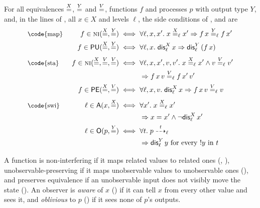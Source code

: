\begin{definition}\label{def:side}
For all equivalences $\overset{X}{=}$, $\overset{Y}{=}$ and $\overset{V}{=}$, functions $f$ and processes
$p$ with output type $Y$, and, in the lines of , all $x \in X$ and levels
$\ell$, the side conditions of ,  and  are
\begin{alignat*}{2}
&\text{\small\code{map}}\; & f \in \NI(\eqv{X},\eqv{Y}) &\iff \forall \ell, x, x'.\;
  x \eqv{X}_\ell x' \Rightarrow f\,x \eqv{Y}_\ell f\,x' \\
&& f \in \mathsf{PU}(\eqv{X},\eqv{Y}) &\iff \forall \ell, x.\;
  \dis^X_\ell\,x \Rightarrow \dis^Y_\ell\,(f\,x) \\[3pt]
&\text{\small\code{sta}} & f \in \NI(\eqv{X},\eqv{V},\eqv{V}) &\iff \forall \ell, x, x', v, v'.\;
  x \eqv{X}_\ell x' \wedge v \eqv{V}_\ell v' \\
&&  &\hphantom{{}\iff{}} \Rightarrow f\,x\,v \eqv{V}_\ell f\,x'\,v' \\
&& f \in \mathsf{PE}(\eqv{X},\eqv{V}) &\iff \forall \ell, x, v.\;
  \dis^X_\ell\,x \Rightarrow f\,x\,v \eqv{V}_\ell v \\[3pt]
&\text{\small\code{swi}} & \ell \in \Aw(x,\eqv{X}) &\iff \forall x'.\; x \eqv{X}_\ell x' \\
&&  &\hphantom{{}\iff{}} \Rightarrow x = x' \wedge \neg\dis^X_\ell\,x' \\
&& \ell \in \Ob(p,\eqv{Y}) &\iff \forall t.\; \perf{p}{t}{\ell} \\
&&  &\hphantom{{}\iff{}} \Rightarrow \dis^Y_\ell\,y \text{ for every $!y$ in $t$}
\end{alignat*}
\end{definition}

A function is non-interfering if it maps related values to related ones
(, ), unobservable-preserving if it maps unobservable values to
unobservable ones (), and preserves equivalence if an unobservable input
does not visibly move the state (). An observer is \emph{aware} of $x$
() if it can tell $x$ from every other value and sees it, and \emph{oblivious} to $p$
() if it sees none of $p$'s outputs.

